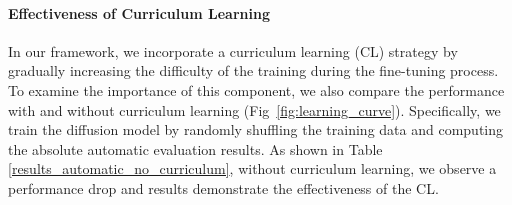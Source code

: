 \paragraph{Effectiveness of Curriculum Learning}
In our framework, we incorporate a curriculum learning (CL) strategy by gradually increasing the difficulty of the training during the fine-tuning process. To examine the importance of this component, we also compare the performance with and without curriculum learning (Fig~\ref{fig:learning_curve}). Specifically, we train the diffusion model by randomly shuffling the training data and computing the absolute automatic evaluation results. As shown in Table \ref{results_automatic_no_curriculum}, without curriculum learning, we observe a performance drop and results demonstrate the effectiveness of the CL.

% 
